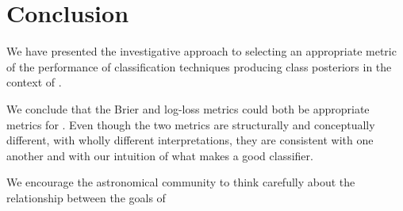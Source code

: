 \section{Conclusion}
\label{sec:conclusion}

We have presented the investigative approach to selecting an appropriate metric of the performance of classification techniques producing class posteriors in the context of \plasticc.

We conclude that the Brier and log-loss metrics could both be appropriate metrics for \plasticc.
Even though the two metrics are structurally and conceptually different, with wholly different interpretations, they are consistent with one another and with our intuition of what makes a good classifier.

We encourage the astronomical community to think carefully about the relationship between the goals of 
